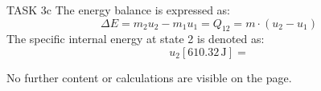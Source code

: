 TASK 3c  
The energy balance is expressed as:  
\[
\Delta E = m_2 u_2 - m_1 u_1 = Q_{12} = m \cdot (u_2 - u_1)
\]  
The specific internal energy at state 2 is denoted as:  
\[
u_2 [610.32 \, \text{J}] = 
\]  

No further content or calculations are visible on the page.